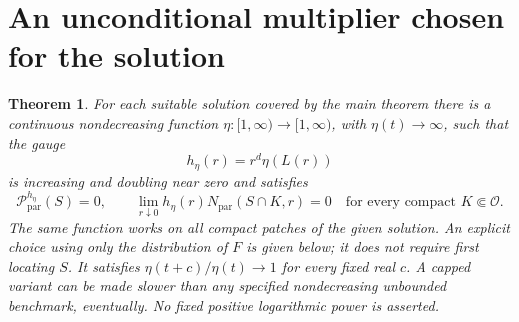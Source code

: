 \documentclass[11pt]{article}
\newtheorem{theorem}{Theorem}
\begin{document}
\section{An unconditional multiplier chosen for the solution}
\begin{theorem}
For each suitable solution covered by the main theorem there is a continuous nondecreasing function $\eta:[1,\infty)\to[1,\infty)$, with $\eta(t)\to\infty$, such that the gauge
$$
h_\eta(r)=r^d\eta(L(r))
$$
is increasing and doubling near zero and satisfies
$$
\mathcal P^{h_\eta}_{\mathrm{par}}(S)=0,
\qquad
\lim_{r\downarrow0}h_\eta(r)N_{\mathrm{par}}(S\cap K,r)=0
\quad\text{for every compact }K\Subset\mathcal O.
$$
The same function works on all compact patches of the given solution. An explicit choice using only the distribution of $F$ is given below; it does not require first locating $S$. It satisfies $\eta(t+c)/\eta(t)\to1$ for every fixed real $c$. A capped variant can be made slower than any specified nondecreasing unbounded benchmark, eventually. No fixed positive logarithmic power is asserted.
\end{theorem}
\end{document}
